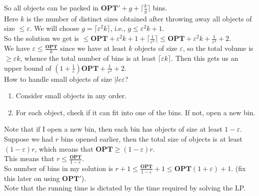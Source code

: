 \documentclass[a4paper]{article}
\newcommand{\nl}{\vspace{0.2cm}\\}
\newcommand{\eps}{\varepsilon}
\newcommand{\OPT}{\mathbf{OPT}}
\begin{document}
So all objects can be packed in $\OPT' + g + \lceil \frac{k}{g} \rceil$ bins.\nl
Here $k$ is the number of distinct sizes obtained after throwing away all objects of size $\le \eps$.
We will choose $g = \lceil \eps^2 k \rceil$, i.e., $g \le \eps^2 k + 1$.\nl
So the solution we get is $\le \OPT + \eps^2 k + 1 + \lceil\frac{1}{\eps^2}\rceil \le \OPT + \eps^2 k + \frac{1}{\eps^2} + 2$.\nl
We have $\eps \le \frac{\OPT}{k}$ since we have at least $k$ objects of size $\eps$, so the total volume is $\ge \eps k$, whence the total number of bins is at least $\lceil \eps k \rceil$. Then this gets us an upper bound of
$\left(1 + \frac{1}{\eps}\right)\OPT + \frac{1}{\eps^2} + 2$.\nl
How to handle small objects of size $|le \eps$?\nl
\begin{enumerate}
    \item Consider small objects in any order.
    \item For each object, check if it can fit into one of the bins. If not, open a new bin.
\end{enumerate}
Note that if I open a new bin, then each bin has objects of size at least $1 - \eps$. Suppose we had $r$ bins opened earlier, then the total size of objects is at least $(1 - \eps)r$, which
means that $\OPT \ge (1 - \eps) r$.\nl
This means that $r \le \frac{\OPT}{1 - \eps}$.\nl
So number of bins in my solution is $r + 1 \le \frac{\OPT}{1 - \eps} + 1 \le \OPT(1 + \eps) + 1$. (fix this later on using $\OPT'$).\nl
Note that the running time is dictated by the time required by solving the LP.\nl
\end{document}
